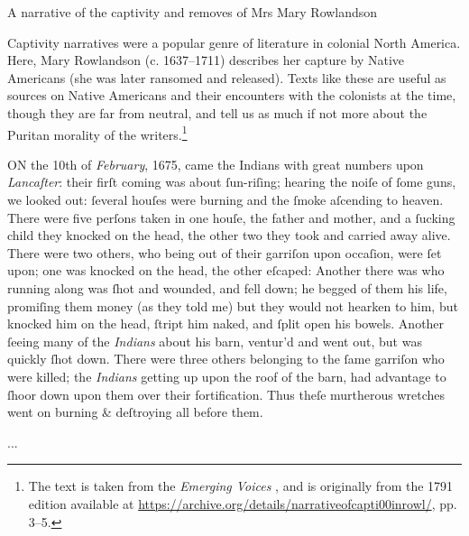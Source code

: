 \begin{texts}{A narrative of the captivity and removes of Mrs Mary Rowlandson}\label{EModE-Robinson-text}

Captivity narratives were a popular genre of literature in colonial North America. Here, Mary Rowlandson (c. 1637--1711) describes her capture by Native Americans (she was later ransomed and released). Texts like these are useful as sources on Native Americans and their encounters with the colonists at the time, though they are far from neutral, and tell us as much if not more about the Puritan morality of the writers.\footnote{The text is taken from the \emph{Emerging Voices}  \citep{Walkden2019}, and is originally from the 1791 edition available at \url{https://archive.org/details/narrativeofcapti00inrowl/}, pp. 3--5.}

\begin{textglossed}
    \internallinenumbers*{}
    ON the 10th of \emph{February}, 1675, came the Indians with great numbers upon \emph{Lancaſter}: their firſt coming was about ſun-riſing; hearing the noiſe of ſome guns, we looked out: ſeveral houſes were burning and the ſmoke aſcending to heaven. There were five perſons taken in one houſe, the father and mother, and a ſucking child they knocked on the head, the other two they took and carried away alive. There were two others, who being out of their garriſon upon occaſion, were ſet upon; one was knocked on the head, the other eſcaped: Another there was who running along was ſhot and wounded, and fell down; he begged of them his life, promiſing them money (as they told me) but they would not hearken to him, but knocked him on the head, ſtript him naked, and ſplit open his bowels. Another ſeeing many of the \emph{Indians} about his barn, ventur'd and went out, but was quickly ſhot down. There were three others belonging to the ſame garriſon who were killed; the \emph{Indians} getting up upon the roof of the barn, had advantage to ſhoor down upon them over their fortification. Thus theſe murtherous wretches went on burning \& deſtroying all before them.
    
    ...
    

\end{textglossed}
\end{texts}
